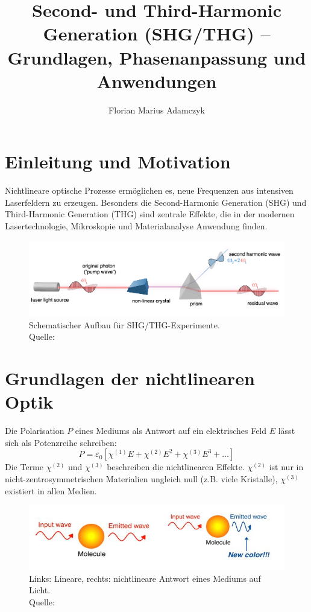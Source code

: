 \documentclass[9pt,a4paper,twocolumn,twoside]{tau-class/tau}
\title{Second- und Third-Harmonic Generation (SHG/THG) – Grundlagen, Phasenanpassung und Anwendungen}
\author[a,1]{Florian Marius Adamczyk}
\affil[a]{Justus-Liebig-Universität Gießen, Institut für Physik, Deutschland}
\newcommand{\figcite}[1]{\\[0mm]{\tiny Quelle: \cite{#1}}}
\begin{document}
		
    \maketitle 
    \thispagestyle{firststyle} 
    \tauabstract 
    

\section{Einleitung und Motivation}
Nichtlineare optische Prozesse ermöglichen es, neue Frequenzen aus intensiven Laserfeldern zu erzeugen. Besonders die Second-Harmonic Generation (SHG) und Third-Harmonic Generation (THG) sind zentrale Effekte, die in der modernen Lasertechnologie, Mikroskopie und Materialanalyse Anwendung finden.

\begin{figure}[!ht]
\centering
\includegraphics[width=0.6\columnwidth]{figures/experimental.png}
\caption{Schematischer Aufbau für SHG/THG-Experimente.\figcite{JkwchuiImage}}
\end{figure}


\section{Grundlagen der nichtlinearen Optik}
Die Polarisation $P$ eines Mediums als Antwort auf ein elektrisches Feld $E$ lässt sich als Potenzreihe schreiben:
\begin{equation}
P = \varepsilon_0\left[\chi^{(1)}E + \chi^{(2)}E^2 + \chi^{(3)}E^3 + \dots\right]
\end{equation}
Die Terme $\chi^{(2)}$ und $\chi^{(3)}$ beschreiben die nichtlinearen Effekte. $\chi^{(2)}$ ist nur in nicht-zentrosymmetrischen Materialien ungleich null (z.B. viele Kristalle), $\chi^{(3)}$ existiert in allen Medien.

\begin{figure}[!ht]
\centering
\includegraphics[width=0.6\columnwidth]{../praes/Images/Fig.1 optics.jpeg}
\caption{Links: Lineare, rechts: nichtlineare Antwort eines Mediums auf Licht.\figcite{Science20NonlinearOptics2014}}
\end{figure}
\end{document}
